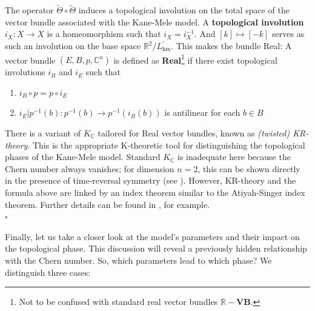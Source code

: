 \begin{rem}
\label{rem:krtheory}
The operator $\tilde{\Theta} \circ \tilde{\Theta}$ induces a topological involution on the total space of the vector bundle associated with the Kane-Mele model.
A \textbf{topological involution} $i_{X} \colon X \to X$ is a homeomorphism such that $i_{X} = i_{X}^{-1}$.
And $[k] \mapsto [-k]$ serves as such an involution on the base space $\mathbb{R}^{2}/L_{\textrm{km}}^{\prime}$.
This makes the bundle {\glqq}Real{\grqq}: A vector bundle $(E,B,p,\mathbb{C}^{n})$ is defined as \textbf{Real}\footnote{Not to be confused with standard real vector bundles $\mathbb{R}-\mathbf{VB}$.} if there exist topological involutions $i_{B}$ and $i_{E}$ such that
\begin{enumerate}
\item[(RB1)]
$i_{B} \circ p = p \circ i_{E}$
\item[(RB2)]
$i_{E} \vert p^{-1}(b) \colon p^{-1}(b) \to p^{-1}(i_{B}(b))$ is antilinear for each $b \in B$
\end{enumerate}
  There is a variant of $K_{\mathbb{C}}$ tailored for Real vector bundles, known as \textit{(twisted) KR-theory}.
This is the appropriate K-theoretic tool for distinguishing the topological phases of the Kane-Mele model.
Standard $K_{\mathbb{C}}$ is inadequate here because the Chern number always vanishes; for dimension $n = 2$, this can be shown directly in the presence of time-reversal symmetry (see \cite{d02f3620}).
However, KR-theory and the formula above are linked by an index theorem similar to the Atiyah-Singer index theorem.
Further details can be found in \cite{fa76af21}, for example.
\\
\phantom{proven}
\hfill
$\square$
\end{rem}
Finally, let us take a closer look at the model's parameters and their impact on the topological phase.
This discussion will reveal a previously hidden relationship with the Chern number.
So, which parameters lead to which phase?
We distinguish three cases:
